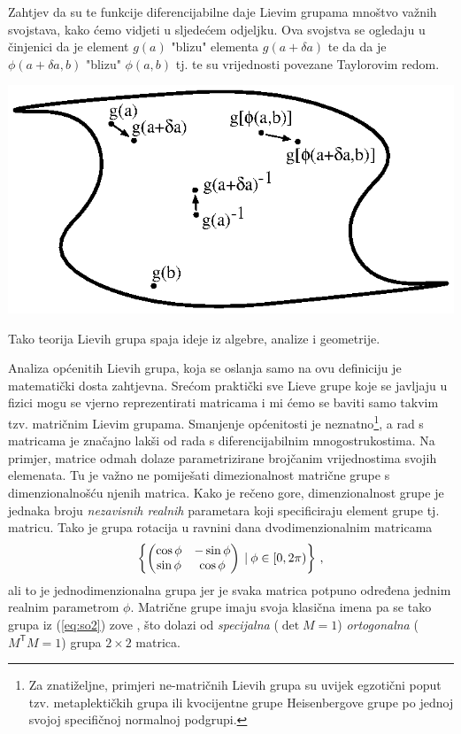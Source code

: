 Zahtjev da su te funkcije diferencijabilne daje Lievim grupama mnoštvo važnih svojstava,
kako ćemo vidjeti u sljedećem odjeljku.
Ova svojstva se ogledaju
u činjenici da je element $g(a)$ "blizu" elementa $g(a+\delta a)$ te da
da je $\phi(a+\delta a, b)$
"blizu" $\phi(a,b)$ tj. te su vrijednosti povezane Taylorovim redom.
\centerline{\includegraphics[scale=1.0]{pics/lieva_mnogostrukost.eps}}
Tako teorija Lievih grupa spaja ideje iz algebre, analize i geometrije.

Analiza općenitih Lievih grupa, koja se oslanja samo na ovu definiciju
je matematički dosta zahtjevna. Srećom praktički sve Lieve grupe koje se javljaju
u fizici mogu se vjerno reprezentirati matricama i mi ćemo se baviti
samo takvim tzv. matričnim Lievim grupama. Smanjenje općenitosti je neznatno\footnote{Za
    znatiželjne, primjeri ne-matričnih Lievih grupa su uvijek egzotični
    poput tzv. metaplektičkih grupa ili kvocijentne grupe Heisenbergove grupe po
jednoj svojoj specifičnoj normalnoj podgrupi.\label{fus:nematricne}},
a rad s matricama je značajno lakši od rada s diferencijabilnim mnogostrukostima.
Na primjer, matrice odmah dolaze parametrizirane brojčanim vrijednostima svojih
elemenata. Tu je važno
ne pomiješati dimezionalnost matrične grupe s dimenzionalnošću njenih matrica.
Kako je rečeno gore, dimenzionalnost grupe je jednaka broju \emph{nezavisnih realnih}
parametara koji specificiraju element grupe tj. matricu. Tako je grupa rotacija
u ravnini dana dvodimenzionalnim matricama
\begin{equation}
    \left\{ \begin{pmatrix}
        \cos\phi & -\sin\phi \\
        \sin\phi & \cos\phi 
    \end{pmatrix} 
     \: | \: \phi \in [0, 2\pi) \right\} \,,
    \label{eq:so2}
\end{equation}
ali to je jednodimenzionalna grupa jer je svaka matrica potpuno određena
jednim realnim parametrom $\phi$. Matrične grupe imaju svoja klasična
imena pa se tako grupa iz (\ref{eq:so2}) zove , što dolazi
od \emph{specijalna} ($\det M = 1$) \emph{ortogonalna} ($M^\mathsf{T} M = 1$) 
grupa $2\times 2$ matrica.



